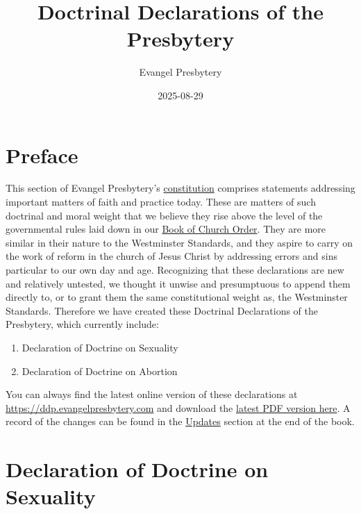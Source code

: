 \documentclass[
]{book}
\title{Doctrinal Declarations of the Presbytery}
\author{Evangel Presbytery}
\date{2025-08-29}
\begin{document}
\maketitle



{
\hypersetup{linkcolor=}
\setcounter{tocdepth}{1}
\tableofcontents
}
\hypertarget{preface}{%
\chapter*{Preface}\label{preface}}

This section of Evangel Presbytery's \href{https://bco.evangelpresbytery.com/preface.html\#c.-constitution-defined}{constitution} comprises statements addressing important matters of faith and practice today. These are matters of such doctrinal and moral weight that we believe they rise above the level of the governmental rules laid down in our \href{https://bco.evangelpresbytery.com/}{Book of Church Order}. They are more similar in their nature to the Westminster Standards, and they aspire to carry on the work of reform in the church of Jesus Christ by addressing errors and sins particular to our own day and age. Recognizing that these declarations are new and relatively untested, we thought it unwise and presumptuous to append them directly to, or to grant them the same constitutional weight as, the Westminster Standards. Therefore we have created these Doctrinal Declarations of the Presbytery, which currently include:

\begin{enumerate}
\def\labelenumi{\arabic{enumi}.}
\item
  Declaration of Doctrine on Sexuality
\item
  Declaration of Doctrine on Abortion
\end{enumerate}

You can always find the latest online version of these declarations at \url{https://ddp.evangelpresbytery.com} and download the \href{https://ddp.evangelpresbytery.com/evangel-presbytery-ddp.pdf}{latest PDF version here}. A record of the changes can be found in the \href{https://ddp.evangelpresbytery.com/updates.html}{Updates} section at the end of the book.

\mainmatter

\hypertarget{declaration-of-doctrine-on-sexuality}{%
\chapter*{Declaration of Doctrine on Sexuality}\label{declaration-of-doctrine-on-sexuality}}
\end{document}
